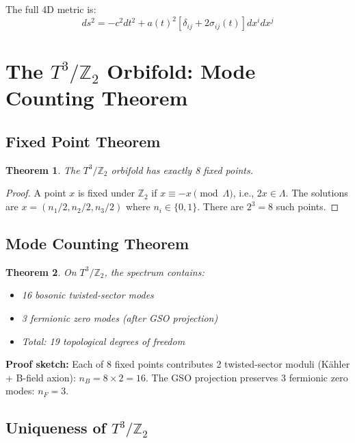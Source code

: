\documentclass[12pt,a4paper]{article}
\newtheorem{theorem}{Theorem}[section]
\newcommand{\Ztwo}{\mathbb{Z}_2}
\newcommand{\Tthree}{T^3}
\newcommand{\nB}{n_B}
\newcommand{\nF}{n_F}
\begin{document}
The full 4D metric is:
\begin{equation}
\boxed{ds^2 = -c^2 dt^2 + a(t)^2 \left[ \delta_{ij} + 2\sigma_{ij}(t) \right] dx^i dx^j}
\end{equation}

\section{The $\Tthree/\Ztwo$ Orbifold: Mode Counting Theorem}
\label{sec:orbifold}

\subsection{Fixed Point Theorem}

\begin{theorem}
The $\Tthree/\Ztwo$ orbifold has exactly 8 fixed points.
\end{theorem}

\begin{proof}
A point $x$ is fixed under $\Ztwo$ if $x \equiv -x \pmod{\Lambda}$, i.e., $2x \in \Lambda$. The solutions are $x = (n_1/2, n_2/2, n_3/2)$ where $n_i \in \{0,1\}$. There are $2^3 = 8$ such points.
\end{proof}

\subsection{Mode Counting Theorem}

\begin{theorem}
On $\Tthree/\Ztwo$, the spectrum contains:
\begin{itemize}
    \item 16 bosonic twisted-sector modes
    \item 3 fermionic zero modes (after GSO projection)
    \item Total: 19 topological degrees of freedom
\end{itemize}
\end{theorem}

\textbf{Proof sketch:} Each of 8 fixed points contributes 2 twisted-sector moduli (K\"ahler + B-field axion): $\nB = 8 \times 2 = 16$. The GSO projection preserves 3 fermionic zero modes: $\nF = 3$.

\subsection{Uniqueness of $\Tthree/\Ztwo$}
\end{document}
